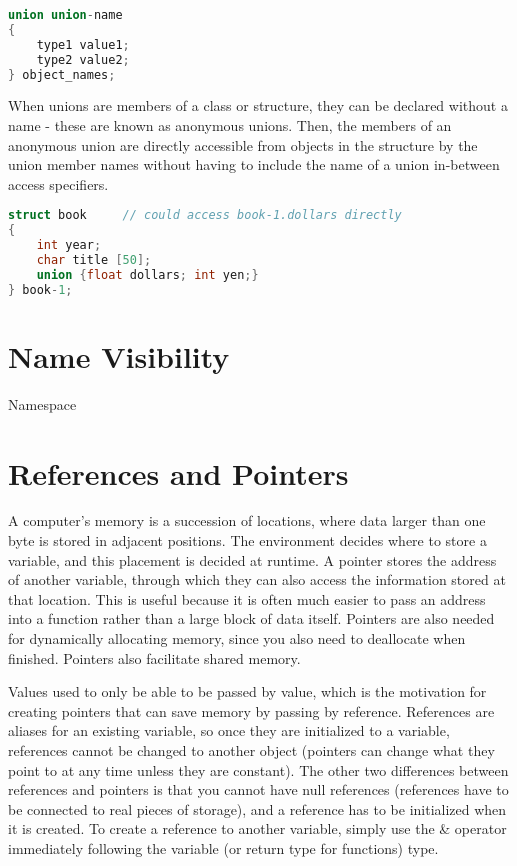 \documentclass[10pt]{article}
\begin{document}
\begin{lstlisting}[language=C++]
union union-name
{
    type1 value1;
    type2 value2;
} object_names;
\end{lstlisting}

When unions are members of a class or structure, they can be declared without a name - these are known as anonymous unions. Then, the members of an anonymous union are directly accessible from objects in the structure by the union member names without having to include the name of a union in-between access specifiers.

\begin{lstlisting}[language=C++]
struct book		// could access book-1.dollars directly
{
    int year;
    char title [50];
    union {float dollars; int yen;}
} book-1;
\end{lstlisting}

\section{Name Visibility}

Namespace

\section{References and Pointers}

A computer's memory is a succession of locations, where data larger than one byte is stored in adjacent positions. The environment decides where to store a variable, and this placement is decided at runtime. A pointer stores the address of another variable, through which they can also access the information stored at that location. This is useful because it is often much easier to pass an address into a function rather than a large block of data itself. Pointers are also needed for dynamically allocating memory, since you also need to deallocate when finished. Pointers also facilitate shared memory. 

Values used to only be able to be passed by value, which is the motivation for creating pointers that can save memory by passing by reference. References are aliases for an existing variable, so once they are initialized to a variable, references cannot be changed to another object (pointers can change what they point to at any time unless they are constant). The other two differences between references and pointers is that you cannot have null references (references have to be connected to real pieces of storage), and a reference has to be initialized when it is created. To create a reference to another variable, simply use the \& operator immediately following the variable (or return type for functions) type.
\end{document}
